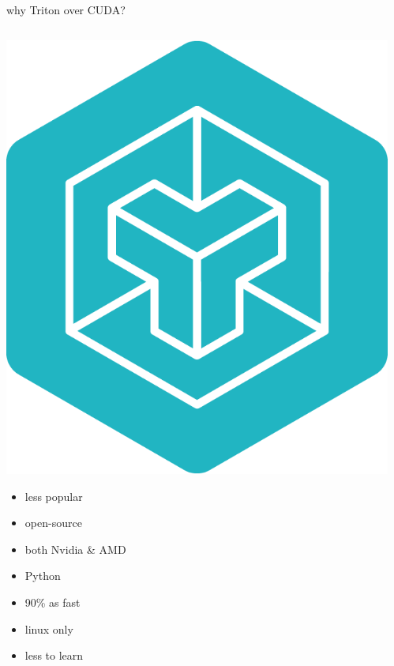 \documentclass[aspectratio=169]{beamer}
\begin{document}
\begin{frame}{why Triton over CUDA?}
\begin{columns}[T]
    \begin{column}[T]{0.4\textwidth}
        \includegraphics[height=0.2\textheight]{pics/triton-logo.png}
        \begin{itemize}
            \item less popular
            \item open-source
            \item both Nvidia \& AMD
            \item Python
            \item 90\% as fast
            \item linux only
            \item less to learn
            \end{itemize}
    \end{column}
    \begin{column}[T]{0.4\textwidth}

\end{column}
\end{columns}
\end{frame}
\end{document}
